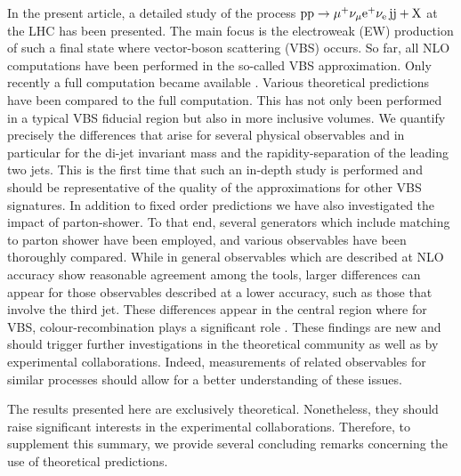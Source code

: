 In the present article, a detailed study of the process $\text{p}\text{p}\to\mu^+\nu_\mu{\rm e}^+\nu_{\rm e}\,\text{j}\text{j}+\mathrm{X}$ at the LHC has been presented.
The main focus is the electroweak (EW) production of such a final state where vector-boson scattering (VBS) occurs.
So far, all NLO computations have been performed in the so-called VBS approximation.
Only recently a full computation became available \cite{Biedermann:2017bss}.
Various theoretical predictions have been compared to the full computation.
This has not only been performed in a typical VBS fiducial region but also in more inclusive volumes.
We quantify precisely the differences that arise for several physical observables and in particular for the di-jet invariant mass and the rapidity-separation of the leading two jets.
This is the first time that such an in-depth study is performed and should be representative of the quality of the approximations for other VBS signatures.
In addition to fixed order predictions we have also investigated the impact of parton-shower.
To that end, several generators which include matching to parton shower have been employed, and various observables have been thoroughly compared.
While in general observables which are described at NLO accuracy show reasonable agreement among the tools, larger differences can 
appear for those observables described at a lower accuracy, such as those that involve the third jet.
These differences appear in the central region where for VBS, colour-recombination plays a significant role .
These findings are new and should trigger further investigations in the theoretical community as well as by experimental collaborations.
Indeed, measurements of related observables for similar processes should allow for a better understanding of these  issues.

The results presented here are exclusively theoretical.
Nonetheless, they should raise significant interests in the experimental collaborations.
Therefore, to supplement this summary, we provide several concluding remarks concerning the use of theoretical predictions.

